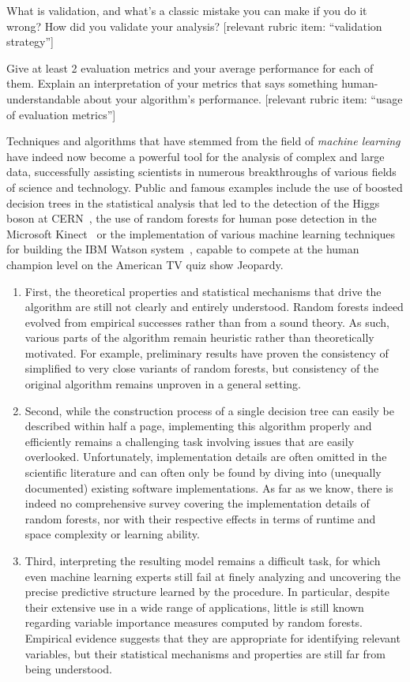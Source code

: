 \documentclass[twoside,openright,titlepage,numbers=noenddot,headinclude,%
               footinclude=true,cleardoublepage=empty,abstractoff,BCOR=5mm,%
               paper=a4,fontsize=11pt,ngerman,american]{scrreprt}
\numberwithin{theorem}{chapter}
\numberwithin{definition}{chapter}
\numberwithin{algorithm}{chapter}
\numberwithin{figure}{chapter}
\numberwithin{table}{chapter}
\numberwithin{equation}{chapter}
\begin{document}
What is validation, and what’s a classic mistake you can make if you do it wrong? How did you validate your analysis?  [relevant rubric item: “validation strategy”]


Give at least 2 evaluation metrics and your average performance for each of them.  Explain an interpretation of your metrics that says something human-understandable about your algorithm’s performance. [relevant rubric item: “usage of evaluation metrics”]


Techniques and algorithms that have stemmed from the field of {\it machine learning} have
indeed now become a powerful tool for the analysis of complex and large data,
successfully assisting scientists in numerous breakthroughs of various fields
of science and technology. Public and famous examples include the use of
boosted decision trees in the statistical analysis that led to the detection of
the Higgs boson at CERN~\citep{chatrchyan:2012}, the use of random forests for
human pose detection in the Microsoft Kinect~\citep{criminisi:2013} or the
implementation of various machine learning techniques for building the IBM
Watson system~\citep{ferrucci:2010}, capable to compete at the human champion
level on the American TV quiz show Jeopardy.


\begin{enumerate}
\item First, the theoretical properties and statistical mechanisms that drive
the algorithm are still not clearly and entirely understood. Random forests
indeed evolved from empirical successes rather than from a sound
theory. As such, various parts of the algorithm remain heuristic rather than
theoretically motivated. For example, preliminary
results have proven the consistency of simplified to very close variants of
random forests, but consistency of the original algorithm remains unproven
in a general setting.
\item Second, while the construction process of a single decision tree can
easily be described within half a page, implementing this algorithm properly
and efficiently remains a challenging task involving issues that are easily
overlooked. Unfortunately, implementation details are often omitted in the
scientific literature and can often only be found by diving into
(unequally documented) existing software implementations. As far as we know,
there is indeed no comprehensive survey covering the implementation details of
random forests, nor with their respective effects in terms of runtime and space
complexity or learning ability.
\item Third, interpreting the resulting model remains a difficult task,
for which even machine learning experts still fail at finely analyzing and
uncovering the precise predictive structure learned by the procedure.
In particular, despite their extensive use in a wide range of applications, little
is still known regarding variable importance measures computed by random forests.
Empirical evidence suggests that they are appropriate for identifying
relevant variables, but their statistical mechanisms and properties are
still far from being understood.
\end{enumerate}
\end{document}
